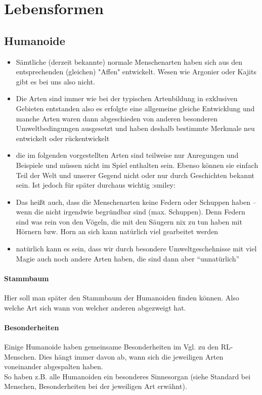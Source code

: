 \section{Lebensformen}
\subsection{Humanoide}
\begin{itemize}
	\item Sämtliche (derzeit bekannte) normale Menschenarten haben sich aus den entsprechenden (gleichen) "Affen" entwickelt. Wesen wie Argonier oder Kajits gibt es bei uns also nicht.
	\item Die Arten sind immer wie bei der typischen Artenbildung in exklusiven Gebieten entstanden
	also es erfolgte eine allgemeine gleiche Entwicklung und manche Arten waren dann abgeschieden von anderen besonderen Umweltbedingungen ausgesetzt und haben deshalb bestimmte Merkmale neu entwickelt oder rückentwickelt
	\item die im folgenden vorgestellten Arten sind teilweise nur Anregungen und Beispiele und müssen nicht im Spiel enthalten sein. Ebenso können sie einfach Teil der Welt und unserer Gegend nicht oder nur durch Geschichten bekannt sein. Ist jedoch für später durchaus wichtig :smiley:
	\item Das heißt auch, dass die Menschenarten keine Federn oder Schuppen haben -- wenn die nicht irgendwie begründbar sind (max. Schuppen). Denn Federn sind was rein von den Vögeln, die mit den Säugern nix zu tun haben
	mit Hörnern bzw. Horn an sich kann natürlich viel gearbeitet werden
	\item natürlich kann es sein, dass wir durch besondere Umweltgeschehnisse mit viel Magie auch noch andere Arten haben, die sind dann aber "`unnatürlich"'
\end{itemize}

\paragraph{Stammbaum} Hier soll man später den Stammbaum der Humanoiden finden können. Also welche Art sich wann von welcher anderen abgezweigt hat.

\paragraph{Besonderheiten}
Einige Humanoide haben gemeinsame Besonderheiten im Vgl. zu den RL-Menschen. Dies hängt immer davon ab, wann sich die jeweiligen Arten voneinander abgespalten haben. \\
So haben z.B. alle Humanoiden ein besonderes Sinnesorgan (siehe Standard bei Menschen, Besonderheiten bei der jeweiligen Art erwähnt).

